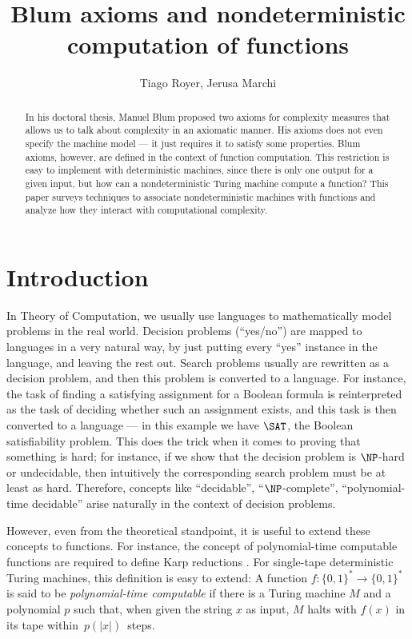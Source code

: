 \documentclass[12pt]{article}
\title{Blum axioms and nondeterministic computation of functions}
\author{Tiago Royer\inst{1}, Jerusa Marchi\inst{1}}
\theoremstyle{definition}
\begin{document}
\maketitle

\begin{abstract}
    In his doctoral thesis,
    Manuel Blum proposed two axioms for complexity measures
    that allows us to talk about complexity in an axiomatic manner.
    His axioms does not even specify the machine model
    --- it just requires it to satisfy some properties.
    Blum axioms, however,
    are defined in the context of function computation.
    This restriction is easy to implement with deterministic machines,
    since there is only one output for a given input,
    but how can a nondeterministic Turing machine compute a function?
    This paper surveys techniques to associate
    nondeterministic machines with functions
    and analyze how they interact with computational complexity.
\end{abstract}

\section{Introduction}

In Theory of Computation,
we usually use languages
to mathematically model problems in the real world.
Decision problems (``yes/no'') are mapped to languages in a very natural way,
by just putting every ``yes'' instance in the language,
and leaving the rest out.
Search problems usually are rewritten as a decision problem,
and then this problem is converted to a language.
For instance,
the task of finding a satisfying assignment for a Boolean formula
is reinterpreted as the task of deciding whether such an assignment exists,
and this task is then converted to a language
--- in this example we have $\SAT$, the Boolean satisfiability problem.
This does the trick when it comes to proving that something is hard;
for instance, if we show that the decision problem is $\NP$-hard or undecidable,
then intuitively the corresponding search problem must be at least as hard.
Therefore,
concepts like ``decidable'', ``$\NP$-complete'', ``polynomial-time decidable''
arise naturally in the context of decision problems.

However, even from the theoretical standpoint,
it is useful to extend these concepts to functions.
For instance,
the concept of polynomial-time computable functions
are required to define Karp reductions \cite[p.~42]{AroraBarak2009}.
For single-tape deterministic Turing machines,
this definition is easy to extend:
A function $f : \{0, 1\}^* \to \{0, 1\}^*$
is said to be \emph{polynomial-time computable}
if there is a Turing machine $M$ and a polynomial $p$ such that,
when given the string $x$ as input,
$M$ halts with $f(x)$ in its tape within~$p(|x|)$~steps.
\end{document}
